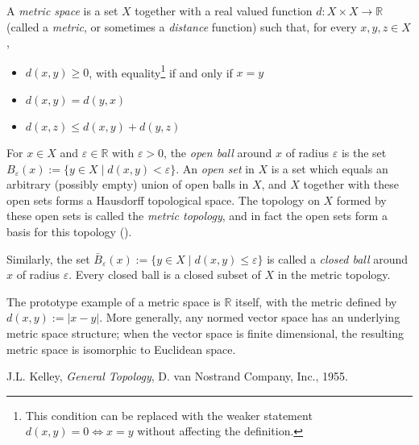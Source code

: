 \documentclass[12pt]{article}
\begin{document}
A \emph{metric space} is a set $X$ together with a real valued function $d: X \times X \longrightarrow \mathbb{R}$ (called a \emph{metric}, or sometimes a \emph{distance} function) such that, for every $x,y,z \in X$,
\begin{itemize}
\item $d(x,y) \geq 0$, with equality\footnote{This condition can be replaced with the weaker statement $d(x,y) = 0 \iff x=y$ without affecting the definition.} if and only if $x=y$
\item $d(x,y) = d(y,x)$
\item $d(x,z) \leq d(x,y) + d(y,z)$
\end{itemize}
For $x \in X$ and $\varepsilon \in \mathbb{R}$ with $\varepsilon > 0$, the \emph{open ball} around $x$ of radius $\varepsilon$ is the set $B_\varepsilon(x) := \{y \in X \mid d(x,y) < \varepsilon\}$. An \emph{open set} in $X$ is a set which equals an arbitrary (possibly empty) union of open balls in $X$, and $X$ together with these open sets forms a Hausdorff topological space. The topology on $X$ formed by these open sets is called the \emph{metric topology}, and in fact the open sets form a basis for this topology ().

Similarly, the set $\bar{B}_\varepsilon(x) := \{y \in X \mid d(x,y) \leq \varepsilon\}$ is called a \emph{closed ball} around $x$ of radius $\varepsilon$. Every closed ball is a closed subset of $X$ in the metric topology.

The prototype example of a metric space is $\mathbb{R}$ itself, with the metric defined by $d(x,y) := |x-y|$. More generally, any normed vector space has an underlying metric space structure; when the vector space is finite dimensional, the resulting metric space is isomorphic to Euclidean space.

\begin{thebibliography}{9}
 J.L. Kelley,
 \emph{General Topology},
 D. van Nostrand Company, Inc., 1955.
 \end{thebibliography}
\end{document}
